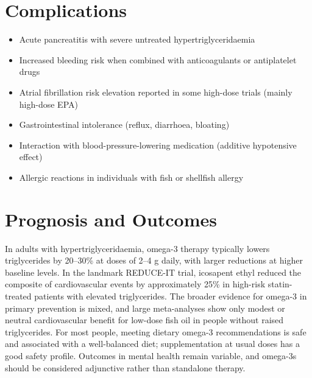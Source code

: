 \section*{Complications}
\begin{itemize}
    \item Acute pancreatitis with severe untreated hypertriglyceridaemia
    \item Increased bleeding risk when combined with anticoagulants or antiplatelet drugs
    \item Atrial fibrillation risk elevation reported in some high-dose trials (mainly high-dose EPA)
    \item Gastrointestinal intolerance (reflux, diarrhoea, bloating)
    \item Interaction with blood-pressure-lowering medication (additive hypotensive effect)
    \item Allergic reactions in individuals with fish or shellfish allergy
\end{itemize}

\section*{Prognosis and Outcomes}
In adults with hypertriglyceridaemia, omega-3 therapy typically lowers triglycerides by 20--30\% at doses of 2--4 g daily, with larger reductions at higher baseline levels. In the landmark REDUCE-IT trial, icosapent ethyl reduced the composite of cardiovascular events by approximately 25\% in high-risk statin-treated patients with elevated triglycerides. The broader evidence for omega-3 in primary prevention is mixed, and large meta-analyses show only modest or neutral cardiovascular benefit for low-dose fish oil in people without raised triglycerides. For most people, meeting dietary omega-3 recommendations is safe and associated with a well-balanced diet; supplementation at usual doses has a good safety profile. Outcomes in mental health remain variable, and omega-3s should be considered adjunctive rather than standalone therapy.

